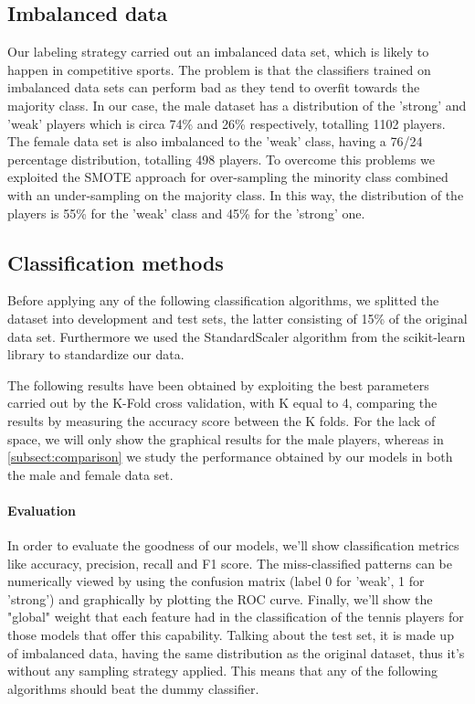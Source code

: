 \subsection{Imbalanced data}
Our labeling strategy carried out an imbalanced data set, which is likely to happen in competitive sports. The problem is that the classifiers trained on imbalanced data sets can perform bad as they tend to overfit towards the majority class. In our case, the male dataset has a distribution of the 'strong' and 'weak' players which is circa 74\% and 26\% respectively, totalling 1102 players. The female data set is also imbalanced to the 'weak' class, having a 76/24 percentage distribution, totalling 498 players. To overcome this problems we exploited the SMOTE approach for over-sampling the minority class combined with an under-sampling on the majority class. In this way, the distribution of the players is 55\% for the 'weak' class and 45\% for the 'strong' one.

\subsection{Classification methods}
Before applying any of the following classification algorithms, we splitted the dataset into development and test sets, the latter consisting of 15\% of the original data set. Furthermore we used the StandardScaler algorithm from the scikit-learn library to standardize our data.

The following results have been obtained by exploiting the best parameters carried out by the K-Fold cross validation, with K equal to 4, comparing the results by measuring the accuracy score between the K folds. For the lack of space, we will only show the graphical results for the male players, whereas in \autoref{subsect:comparison} we study the performance obtained by our models in both the male and female data set.

\paragraph{Evaluation} In order to evaluate the goodness of our models, we'll show classification metrics like accuracy, precision, recall and F1 score. The miss-classified patterns can be numerically viewed by using the confusion matrix (label 0 for 'weak', 1 for 'strong') and graphically by plotting the ROC curve. Finally, we'll show the "global" weight that each feature had in the classification of the tennis players for those models that offer this capability. Talking about the test set, it is made up of imbalanced data, having the same distribution as the original dataset, thus it's without any sampling strategy applied. This means that any of the following algorithms should beat the dummy classifier.


